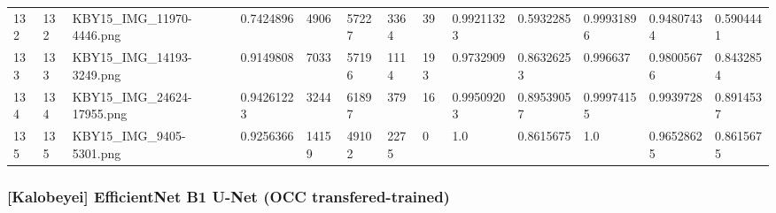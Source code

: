 \documentclass[11pt, a4paper, twoside]{report}
\begin{document}
\begin{longtable}[c]{@{}lllllllllllll@{}}
132 & 132 & KBY15\_IMG\_11970-4446.png & 0.7424896 & 4906 & 57227 & 3364 & 39 & 0.99211323 & 0.5932285 & 0.99931896 & 0.94807434 & 0.5904441 \\
133 & 133 & KBY15\_IMG\_14193-3249.png & 0.9149808 & 7033 & 57196 & 1114 & 193 & 0.9732909 & 0.86326253 & 0.996637 & 0.98005676 & 0.8432854 \\
134 & 134 & KBY15\_IMG\_24624-17955.png & 0.94261223 & 3244 & 61897 & 379 & 16 & 0.99509203 & 0.89539057 & 0.99974155 & 0.9939728 & 0.8914537 \\
135 & 135 & KBY15\_IMG\_9405-5301.png & 0.9256366 & 14159 & 49102 & 2275 & 0 & 1.0 & 0.8615675 & 1.0 & 0.96528625 & 0.8615675 \\* \bottomrule
\end{longtable}

\newpage

\subsubsection{[Kalobeyei] EfficientNet B1 U-Net (OCC transfered-trained)}
\end{document}
